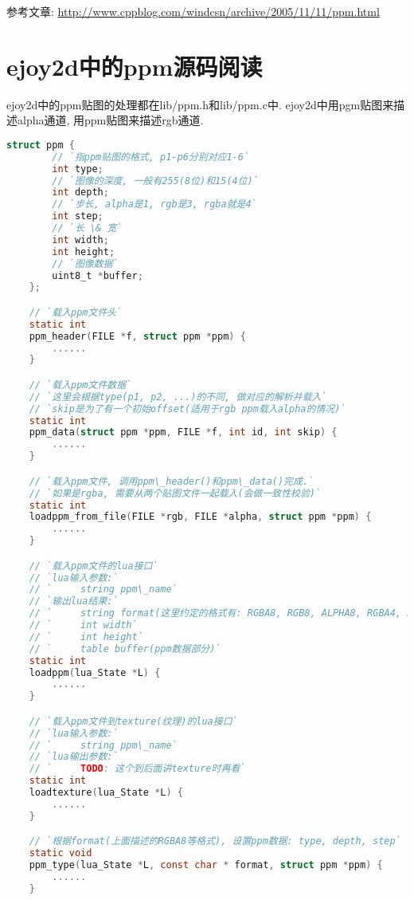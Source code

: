{    \par{参考文章: \href{http://www.cppblog.com/windcsn/archive/2005/11/11/ppm.html}{http://www.cppblog.com/windcsn/archive/2005/11/11/ppm.html}}
}

\section{\ZHH ejoy2d中的ppm源码阅读}{
    {ejoy2d中的ppm贴图的处理都在lib/ppm.h和lib/ppm.c中. ejoy2d中用pgm贴图来描述alpha通道, 用ppm贴图来描述rgb通道. }\par
    \begin{lstlisting}[language=C]
    struct ppm {
        // `指ppm贴图的格式, p1-p6分别对应1-6`
        int type;
        // `图像的深度, 一般有255(8位)和15(4位)`
        int depth;
        // `步长, alpha是1, rgb是3, rgba就是4`
        int step;
        // `长 \& 宽`
        int width;
        int height;
        // `图像数据`
        uint8_t *buffer;
    };

    // `载入ppm文件头`
    static int
    ppm_header(FILE *f, struct ppm *ppm) {
        ......
    }

    // `载入ppm文件数据`
    // `这里会根据type(p1, p2, ...)的不同, 做对应的解析并载入`
    // `skip是为了有一个初始offset(适用于rgb ppm载入alpha的情况)`
    static int
    ppm_data(struct ppm *ppm, FILE *f, int id, int skip) {
        ......
    }

    // `载入ppm文件, 调用ppm\_header()和ppm\_data()完成.`
    // `如果是rgba, 需要从两个贴图文件一起载入(会做一致性校验)`
    static int
    loadppm_from_file(FILE *rgb, FILE *alpha, struct ppm *ppm) {
        ......
    }

    // `载入ppm文件的lua接口`
    // `lua输入参数:`
    // `     string ppm\_name`
    // `输出lua结果:`
    // `     string format(这里约定的格式有: RGBA8, RGB8, ALPHA8, RGBA4, RGB4, ALPHA4)`
    // `     int width`
    // `     int height`
    // `     table buffer(ppm数据部分)`
    static int
    loadppm(lua_State *L) {
        ......
    }

    // `载入ppm文件到texture(纹理)的lua接口`
    // `lua输入参数:`
    // `     string ppm\_name`
    // `lua输出参数:`
    // `     TODO: 这个到后面讲texture时再看`
    static int
    loadtexture(lua_State *L) {
        ......
    }

    // `根据format(上面描述的RGBA8等格式), 设置ppm数据: type, depth, step`
    static void
    ppm_type(lua_State *L, const char * format, struct ppm *ppm) {
        ......
    }


\end{lstlisting}}
